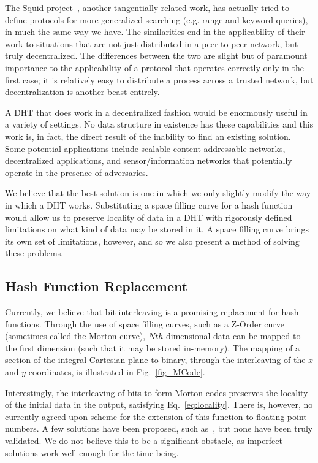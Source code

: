 \documentclass[10pt]{IEEEtran}
\begin{document}
\par The Squid project~\cite{Schmidt:2003cd}, another tangentially related work, has actually tried to define protocols for more generalized searching (e.g. range and keyword queries), in much the same way we have. The similarities end in the applicability of their work to situations that are not just distributed in a peer to peer network, but truly decentralized. The differences between the two are slight but of paramount importance to the applicability of a protocol that operates correctly only in the first case; it is relatively easy to distribute a process across a trusted network, but decentralization is another beast entirely.

\par A DHT that does work in a decentralized fashion would be enormously useful in a variety of settings. No data structure in existence has these capabilities and this work is, in fact, the direct result of the inability to find an existing solution. Some potential applications include scalable content addressable networks, decentralized applications, and sensor/information networks that potentially operate in the presence of adversaries.




\par We believe that the best solution is one in which we only slightly modify the way in which a DHT works. Substituting a space filling curve for a hash function would allow us to preserve locality of data in a DHT with rigorously defined limitations on what kind of data may be stored in it. A space filling curve brings its own set of limitations, however, and so we also present a method of solving these problems.

\subsection{Hash Function Replacement}

\par Currently, we believe that bit interleaving is a promising replacement for hash functions. Through the use of space filling curves, such as a Z-Order curve (sometimes called the Morton curve), $Nth$-dimensional data can be mapped to the first dimension (such that it may be stored in-memory). The mapping of a section of the integral Cartesian plane to binary, through the interleaving of the $x$ and $y$ coordinates, is illustrated in Fig.~\ref{fig_MCode}.

\par Interestingly, the interleaving of bits to form Morton codes preserves the locality of the initial data in the output, satisfying Eq.~\ref{eq:locality}. There is, however, no currently agreed upon scheme for the extension of this function to floating point numbers. A few solutions have been proposed, such as~\cite{Connor:2010eq}, but none have been truly validated. We do not believe this to be a significant obstacle, as imperfect solutions work well enough for the time being.
\end{document}
